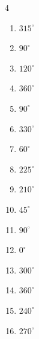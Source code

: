 \begin{multicols}{4}
\begin{enumerate}
  \item $\displaystyle 315^{\circ}$

  \item $\displaystyle 90^{\circ}$

  \item $\displaystyle 120^{\circ}$

  \item $\displaystyle 360^{\circ}$
        \phantom{$\displaystyle =2\pi$}

  \item $\displaystyle 90^{\circ}$

  \item $\displaystyle 330^{\circ}$

  \item $\displaystyle 60^{\circ}$

  \item $\displaystyle 225^{\circ}$

  \item $\displaystyle 210^{\circ}$

  \item $\displaystyle 45^{\circ}$

  \item $\displaystyle 90^{\circ}$

  \item $\displaystyle 0^{\circ}$
        \phantom{$\displaystyle =0$}

  \item $\displaystyle 300^{\circ}$

  \item $\displaystyle 360^{\circ}$
        \phantom{$\displaystyle =2\pi$}

\columnbreak %

\resetques

  \item $\displaystyle 240^{\circ}$

  \item $\displaystyle 270^{\circ}$


\end{enumerate}
\end{multicols}
